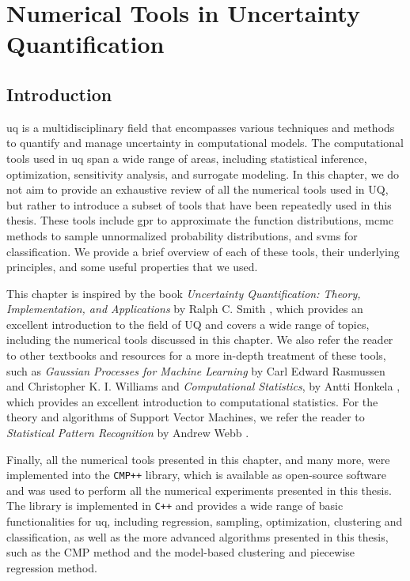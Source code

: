 %
\chapter{Numerical Tools in Uncertainty Quantification}
\label{sec:ntools}


\section{Introduction}
\label{sec:ntools:intro}

\gls{uq} is a multidisciplinary field that encompasses various techniques and methods to quantify and manage uncertainty in computational models. The computational tools used in \gls{uq} span a wide range of areas, including statistical inference, optimization, sensitivity analysis, and surrogate modeling. In this chapter, we do not aim to provide an exhaustive review of all the numerical tools used in UQ, but rather to introduce a subset of tools that have been repeatedly used in this thesis. These tools include \gls{gpr} to approximate the function distributions, \gls{mcmc} methods to sample unnormalized probability distributions, and \glspl{svm} for classification. We provide a brief overview of each of these tools, their underlying principles, and some useful properties that we used.

\smallskip
This chapter is inspired by the book \textit{Uncertainty Quantification: Theory, Implementation, and Applications} by Ralph C. Smith \cite{uq_theory}, which provides an excellent introduction to the field of UQ and covers a wide range of topics, including the numerical tools discussed in this chapter. We also refer the reader to other textbooks and resources for a more in-depth treatment of these tools, such as \textit{Gaussian Processes for Machine Learning} by Carl Edward Rasmussen and Christopher K. I. Williams \cite{gp_rasmussen} and \textit{Computational Statistics}, by Antti Honkela \cite{comp_stat}, which provides an excellent introduction to computational statistics. For the theory and algorithms of Support Vector Machines, we refer the reader to \textit{Statistical Pattern Recognition} by Andrew Webb \cite{stats_pr}.

\smallskip
Finally, all the numerical tools presented in this chapter, and many more, were implemented into the \texttt{CMP++} library, which is available as open-source software~\cite{CMP++} and was used to perform all the numerical experiments presented in this thesis. The library is implemented in \texttt{C++} and provides a wide range of basic functionalities for \gls{uq}, including regression, sampling, optimization, clustering and classification, as well as the more advanced algorithms presented in this thesis, such as the CMP method and the model-based clustering and piecewise regression method.


